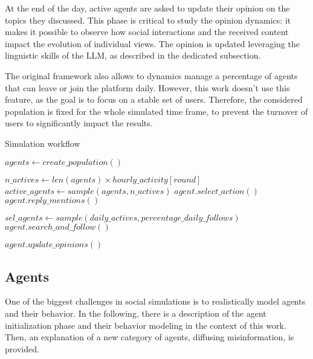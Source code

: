At the end of the day, active agents are asked to update their opinion on the topics they discussed.
This phase is critical to study the opinion dynamics: it makes it possible to observe how social interactions and the received content impact the evolution of individual views.
The opinion is updated leveraging the linguistic skills of the LLM, as described in the dedicated subsection.

\medskip
The original framework also allows to dynamics manage a percentage of agents that can leave or join the platform daily. 
However, this work doesn't use this feature, as the goal is to focus on a stable set of users.
Therefore, the considered population is fixed for the whole simulated time frame, to prevent the turnover of users to significantly impact the results.

\begin{algorithm}
\caption{Simulation workflow}
\label{alg:workflow}
\begin{algorithmic}[1]
\STATE $agents \gets create\_population()$

        \STATE $n\_actives \gets len(agents) \times hourly\_activity[round]$
        \STATE $active\_agents \gets sample(agents, n\_actives)$ 
            \STATE $agent.select\_action()$
            \STATE $agent.reply\_mentions()$
        \ENDFOR
    \ENDFOR

    \STATE $sel\_agents \gets sample(daily\_actives, percentage\_daily\_follows)$
        \STATE $agent.search\_and\_follow()$
    \ENDFOR

        \STATE $agent.update\_opinions()$
    \ENDFOR

\ENDFOR
\end{algorithmic}
\end{algorithm}



\subsection{Agents}
One of the biggest challenges in social simulations is to realistically model agents and their behavior.
In the following, there is a description of the agent initialization phase and their behavior modeling in the context of this work. 
Then, an explanation of a new category of agents, diffusing misinformation, is provided.


